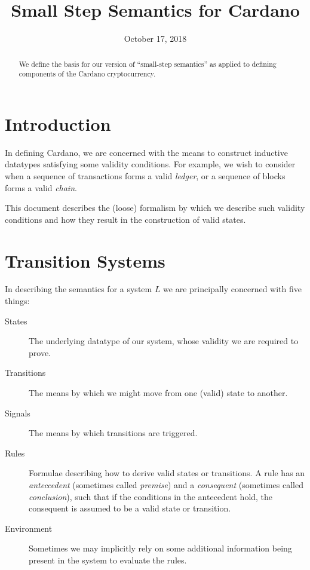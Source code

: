 \documentclass[11pt,a4paper]{article}
\theoremstyle{definition}
\theoremstyle{remark}
\begin{document}
\title{Small Step Semantics for Cardano}
\author{}
\date{October 17, 2018}

\maketitle

\begin{abstract}
We define the basis for our version of ``small-step semantics'' as applied to
defining components of the Cardano cryptocurrency.
\end{abstract}

\section{Introduction}
\label{sec:introduction}

In defining Cardano, we are concerned with the means to construct inductive
datatypes satisfying some validity conditions. For example, we wish to consider
when a sequence of transactions forms a valid \textit{ledger}, or a sequence of
blocks forms a valid \textit{chain}.

This document describes the (loose) formalism by which we describe such validity
conditions and how they result in the construction of valid states.

\section{Transition Systems}
\label{sec:preliminaries}

In describing the semantics for a system $L$ we are principally concerned with
five things:

\begin{description}
\item [States] The underlying datatype of our system, whose validity we are
  required to prove.
\item [Transitions] The means by which we might move from one (valid) state to
  another.
\item [Signals] The means by which transitions are triggered.
\item [Rules] Formulae describing how to derive valid states or transitions. A
  rule has an \textit{anteccedent} (sometimes called \textit{premise}) and a \textit{consequent} (sometimes called \textit{conclusion}), such that if the
  conditions in the antecedent hold, the consequent is assumed to be a valid
  state or transition.
\item [Environment] Sometimes we may implicitly rely on some additional
  information being present in the system to evaluate the rules.
\end{description}
\end{document}
